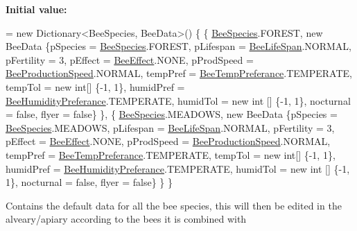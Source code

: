 {\bfseries Initial value\+:}
\begin{DoxyCode}
= \textcolor{keyword}{new} Dictionary<BeeSpecies, BeeData>()
        \{
            \{ \hyperlink{namespace_bee_game_1_1_enums_aa2ead984825678d83c42d48f6382619c}{BeeSpecies}.FOREST, \textcolor{keyword}{new} BeeData \{pSpecies = \hyperlink{namespace_bee_game_1_1_enums_aa2ead984825678d83c42d48f6382619c}{BeeSpecies}.FOREST, pLifespan =
       \hyperlink{namespace_bee_game_1_1_enums_ae3853807ded2f4d99a0d4a7fb4b2bc46}{BeeLifeSpan}.NORMAL, pFertility = 3, pEffect = \hyperlink{namespace_bee_game_1_1_enums_acf7ae32a86385a40fc0c7b55af95c6c3}{BeeEffect}.NONE, pProdSpeed = 
      \hyperlink{namespace_bee_game_1_1_enums_afee18200a21cc4b8e1d0cdb669930f14}{BeeProductionSpeed}.NORMAL, tempPref = \hyperlink{namespace_bee_game_1_1_enums_a9db0f9ac859fab168654d657f248b024}{BeeTempPreferance}.TEMPERATE, 
      tempTol = \textcolor{keyword}{new} \textcolor{keywordtype}{int}[] \{-1, 1\}, humidPref = \hyperlink{namespace_bee_game_1_1_enums_a66566cbc9da8d1d1e402156b4bd3bf9d}{BeeHumidityPreferance}.TEMPERATE, humidTol = \textcolor{keyword}{new} \textcolor{keywordtype}{int}
      [] \{-1, 1\}, nocturnal = \textcolor{keyword}{false}, flyer = \textcolor{keyword}{false}\} \},
            \{ \hyperlink{namespace_bee_game_1_1_enums_aa2ead984825678d83c42d48f6382619c}{BeeSpecies}.MEADOWS, \textcolor{keyword}{new} BeeData \{pSpecies = \hyperlink{namespace_bee_game_1_1_enums_aa2ead984825678d83c42d48f6382619c}{BeeSpecies}.MEADOWS, pLifespan
       = \hyperlink{namespace_bee_game_1_1_enums_ae3853807ded2f4d99a0d4a7fb4b2bc46}{BeeLifeSpan}.NORMAL, pFertility = 3, pEffect = \hyperlink{namespace_bee_game_1_1_enums_acf7ae32a86385a40fc0c7b55af95c6c3}{BeeEffect}.NONE, pProdSpeed = 
      \hyperlink{namespace_bee_game_1_1_enums_afee18200a21cc4b8e1d0cdb669930f14}{BeeProductionSpeed}.NORMAL, tempPref = \hyperlink{namespace_bee_game_1_1_enums_a9db0f9ac859fab168654d657f248b024}{BeeTempPreferance}.TEMPERATE, 
      tempTol = \textcolor{keyword}{new} \textcolor{keywordtype}{int}[] \{-1, 1\}, humidPref = \hyperlink{namespace_bee_game_1_1_enums_a66566cbc9da8d1d1e402156b4bd3bf9d}{BeeHumidityPreferance}.TEMPERATE, humidTol = \textcolor{keyword}{new} \textcolor{keywordtype}{int}
      [] \{-1, 1\}, nocturnal = \textcolor{keyword}{false}, flyer = \textcolor{keyword}{false}\} \}
        \}
\end{DoxyCode}


Contains the default data for all the bee species, this will then be edited in the alveary/apiary according to the bees it is combined with 



